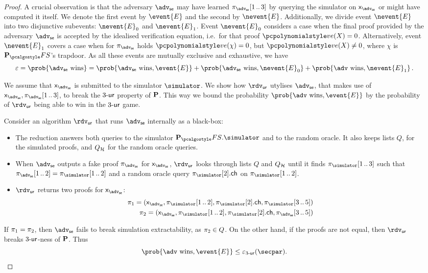 \documentclass[runningheads,11pt]{llncs}
\theoremstyle{definition}
\begin{document}
\begin{proof}
A crucial observation is that the adversary $\advse$ may have learned $\zkproof_{\advse}\range{1}{3}$ by querying the simulator on $\inp_{\advse}$ or might have computed it itself. We denote the first event by $\event{E}$ and the second by $\nevent{E}$. 
%
Additionally, we divide event $\nevent{E}$ into two disjunctive subevents: $\nevent{E}_0$ and $\nevent{E}_1$. 
Event $\nevent{E}_0$ considers a case when the final proof provided by the adversary $\advse$ is accepted by the idealised verification equation, i.e.~for that proof $\vereq(X) = 0$. 
Alternatively, event $\nevent{E}_1$ covers a case when for $\zkproof_\advse$ holds $\vereq(\chi) = 0$, but $\vereq(X) \neq 0$, where $\chi$ is $\plonkprotfs$'s trapdoor.
%
As all these events are mutually exclusive and exhaustive, we have
\[
	\eps = \prob{\advse \text{ wins}} = \prob{\advse \text{ wins}, \event{E}} + \prob{\advse \text{ wins}, \nevent{E}_0} + \prob{\adv \text{ wins}, \nevent{E}_1}\,.
\]

We assume that $\inp_{\advse}$ is submitted to the simulator $\simulator$. 
We show how $\rdvur$ utylises $\advse$, that makes use of $\inp_\advse, \zkproof_{\advse}\range{1}{3}$, to break the ${3\text{-}\mathsf{ur}}$ property of $\mathbf{P}$. 
This way we bound the probability $\prob{\adv \text{ wins}, \event{E}}$ by the probability of $\rdvur$ being able to win in the ${3\text{-}\mathsf{ur}}$ game.

Consider an algorithm $\rdvur$ that runs $\advse$ internally as a black-box:
\begin{itemize}
	\item The reduction answers both queries to the simulator $\plonkprotfs.\simulator$ and to the random oracle. 
	It also keeps lists $Q$, for the simulated proofs, and $Q_{\mathcal{H}}$ for the random oracle queries. 
	\item When $\advse$ outputs a fake proof $\zkproof_{\advse}$ for  $\inp_\advse$, $\rdvur$ looks through lists $Q$ and $Q_{\mathcal{H}}$ until it finds 
	$\zkproof_{\simulator}\range{1}{3}$ such that $\zkproof_{\advse}\range{1}{2} = \zkproof_{\simulator}\range{1}{2}$ and a random oracle query $\zkproof_{\simulator}[2].\ch$ on $\zkproof_{\simulator}\range{1}{2}$.
	\item $\rdvur$ returns two proofs for $\inp_\advse$:
	\begin{align*}
		\zkproof_1 = (\inp_{\advse},\zkproof_{\simulator}\range{1}{2}, \zkproof_{\simulator}[2].\ch, \zkproof_{\simulator}\range{3}{5})\\
		\zkproof_2 = (\inp_{\advse}, \zkproof_{\simulator}\range{1}{2}, \zkproof_{\simulator}[2].\ch, \zkproof_{\advse}\range{3}{5})
	\end{align*}
	\end{itemize}  
	If $\pi_1 = \pi_2$, then $\advse$ fails to break simulation extractability, as $\pi_2 \in Q$.
	On the other hand, if the proofs are not equal, then $\rdvur$ breaks ${3\text{-}\mathsf{ur}}$-ness of $\mathbf{P}$. Thus 
	\[
		\prob{\adv \text{ wins}, \event{E}} \leq \eps_{\ur{3}}(\secpar).
	\]
	

\end{proof}
\end{document}
